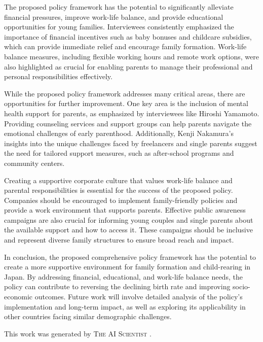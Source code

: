 \documentclass{article} %
\begin{document}
The proposed policy framework has the potential to significantly alleviate financial pressures, improve work-life balance, and provide educational opportunities for young families. Interviewees consistently emphasized the importance of financial incentives such as baby bonuses and childcare subsidies, which can provide immediate relief and encourage family formation. Work-life balance measures, including flexible working hours and remote work options, were also highlighted as crucial for enabling parents to manage their professional and personal responsibilities effectively.

While the proposed policy framework addresses many critical areas, there are opportunities for further improvement. One key area is the inclusion of mental health support for parents, as emphasized by interviewees like Hiroshi Yamamoto. Providing counseling services and support groups can help parents navigate the emotional challenges of early parenthood. Additionally, Kenji Nakamura's insights into the unique challenges faced by freelancers and single parents suggest the need for tailored support measures, such as after-school programs and community centers.

Creating a supportive corporate culture that values work-life balance and parental responsibilities is essential for the success of the proposed policy. Companies should be encouraged to implement family-friendly policies and provide a work environment that supports parents. Effective public awareness campaigns are also crucial for informing young couples and single parents about the available support and how to access it. These campaigns should be inclusive and represent diverse family structures to ensure broad reach and impact.

In conclusion, the proposed comprehensive policy framework has the potential to create a more supportive environment for family formation and child-rearing in Japan. By addressing financial, educational, and work-life balance needs, the policy can contribute to reversing the declining birth rate and improving socio-economic outcomes. Future work will involve detailed analysis of the policy's implementation and long-term impact, as well as exploring its applicability in other countries facing similar demographic challenges.

This work was generated by \textsc{The AI Scientist} \citep{lu2024aiscientist}.



\end{document}
